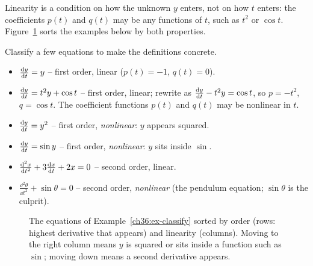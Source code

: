 Linearity is a condition on how the unknown $y$ enters, not on how $t$ enters: the coefficients $p(t)$ and $q(t)$ may be any functions of $t$, such as $t^2$ or $\cos t$. Figure~\ref{ch36:fig-classify} sorts the examples below by both properties.

\begin{example}
\label{ch36:ex-classify}
Classify a few equations to make the definitions concrete.
\begin{itemize}
  \item $\frac{\mathrm{d} y}{\mathrm{d} t} = y$ \quad -- first order, linear ($p(t) = -1$, $q(t)=0$).
  \item $\frac{\mathrm{d} y}{\mathrm{d} t} = t^2 y + \cos t$ \quad -- first order, linear; rewrite as $\frac{\mathrm{d} y}{\mathrm{d} t} - t^2 y = \cos t$, so $p = -t^2$, $q = \cos t$. The coefficient functions $p(t)$ and $q(t)$ may be nonlinear in $t$.
  \item $\frac{\mathrm{d} y}{\mathrm{d} t} = y^2$ \quad -- first order, \emph{nonlinear}: $y$ appears squared.
  \item $\frac{\mathrm{d} y}{\mathrm{d} t} = \sin y$ \quad -- first order, \emph{nonlinear}: $y$ sits inside $\sin$.
  \item $\frac{\mathrm{d}^2 x}{\mathrm{d} t^2} + 3\frac{\mathrm{d} x}{\mathrm{d} t} + 2x = 0$ \quad -- second order, linear.
  \item $\frac{\dd^2 \theta}{\dd t^2} + \sin\theta = 0$ \quad -- second order, \emph{nonlinear} (the pendulum equation; $\sin\theta$ is the culprit).
\end{itemize}
\end{example}

\begin{figure}[htbp]
\centering
{}
\caption{The equations of Example~\ref{ch36:ex-classify} sorted by order (rows: highest derivative that appears) and linearity (columns). Moving to the right column means $y$ is squared or sits inside a function such as $\sin$; moving down means a second derivative appears.}
\label{ch36:fig-classify}
\end{figure}

